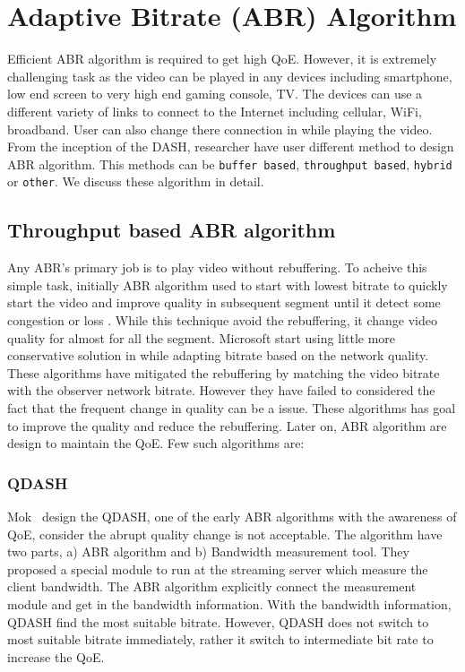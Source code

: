 \section{Adaptive Bitrate (ABR) Algorithm}
Efficient ABR algorithm is required to get high QoE. However, it is extremely challenging task as the video can be played in any devices including smartphone, low end screen to very high end gaming console, TV. The devices can use a different variety of links to connect to the Internet including cellular, WiFi, broadband. User can also change there connection in while playing the video. From the inception of the DASH, researcher have user different method to design ABR algorithm. This methods can be {\tt buffer based}, {\tt throughput based}, {\tt hybrid} or {\tt other}. We discuss these algorithm in detail.

\subsection{Throughput based ABR algorithm}
Any ABR's primary job is to play video without rebuffering. To acheive this simple task, initially ABR algorithm used to start with lowest bitrate to quickly start the video and improve quality in subsequent segment until it detect some congestion or loss \cite{5677508,10.1145/1943552.1943575}. While this technique avoid the rebuffering, it change video quality for almost for all the segment. Microsoft start using little more conservative solution in \cite{10.1145/1943552.1943574} while adapting bitrate based on the network quality. These algorithms have mitigated the rebuffering by matching the video bitrate with the observer network bitrate. However they have failed to considered the fact that the frequent change in quality can be a issue. These algorithms has goal to improve the quality and reduce the rebuffering. Later on, ABR algorithm are design to maintain the QoE. Few such algorithms are:

\subsubsection{QDASH\cite{10.1145/2155555.2155558}}
Mok \etal\ design the QDASH\cite{10.1145/2155555.2155558}, one of the early ABR algorithms with the awareness of QoE, consider the abrupt quality change is not acceptable. The algorithm have two parts, a) ABR algorithm and b) Bandwidth measurement tool. They proposed a special module to run at the streaming server which measure the client bandwidth. The ABR algorithm explicitly connect the measurement module and get in the bandwidth information. With the bandwidth information, QDASH find the most suitable bitrate. However, QDASH does not switch to most suitable bitrate immediately, rather it switch to intermediate bit rate to increase the QoE.

